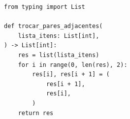 \ifmostrarGabarito
\begin{verbatim}
from typing import List

def trocar_pares_adjacentes(
    lista_itens: List[int],
) -> List[int]:
    res = list(lista_itens)
    for i in range(0, len(res), 2):
        res[i], res[i + 1] = (
            res[i + 1],
            res[i],
        )
    return res
\end{verbatim}

\fi
